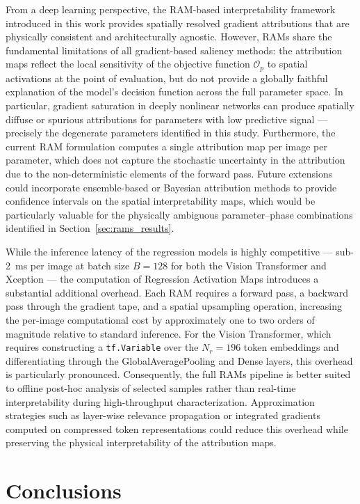\documentclass[final,5p,times,twocolumn]{elsarticle}
\begin{document}
From a deep learning perspective, the RAM-based 
interpretability framework introduced in this work 
provides spatially resolved gradient attributions 
that are physically consistent and architecturally 
agnostic. However, RAMs share the fundamental 
limitations of all gradient-based saliency methods: 
the attribution maps reflect the local sensitivity 
of the objective function $\mathcal{O}_p$ to spatial 
activations at the point of evaluation, but do not 
provide a globally faithful explanation of the 
model's decision function across the full parameter 
space. In particular, gradient saturation in deeply 
nonlinear networks can produce spatially diffuse 
or spurious attributions for parameters with low 
predictive signal --- precisely the degenerate 
parameters identified in this study. Furthermore, 
the current RAM formulation computes a single 
attribution map per image per parameter, which 
does not capture the stochastic uncertainty in 
the attribution due to the non-deterministic 
elements of the forward pass. Future extensions 
could incorporate ensemble-based or Bayesian 
attribution methods to provide confidence intervals 
on the spatial interpretability maps, which would 
be particularly valuable for the physically 
ambiguous parameter--phase combinations identified 
in Section~\ref{sec:rams_results}.

While the inference latency of the regression models 
is highly competitive --- sub-2~ms per image at 
batch size $B=128$ for both the Vision Transformer 
and Xception --- the computation of Regression 
Activation Maps introduces a substantial additional 
overhead. Each RAM requires a forward pass, a 
backward pass through the gradient tape, and a 
spatial upsampling operation, increasing the 
per-image computational cost by approximately one 
to two orders of magnitude relative to standard 
inference. For the Vision Transformer, which 
requires constructing a \texttt{tf.Variable} over 
the $N_r = 196$ token embeddings and differentiating 
through the GlobalAveragePooling and Dense layers, 
this overhead is particularly pronounced. 
Consequently, the full RAMs pipeline is better 
suited to offline post-hoc analysis of selected 
samples rather than real-time interpretability 
during high-throughput characterization. 
Approximation strategies such as layer-wise 
relevance propagation or integrated gradients 
computed on compressed token representations could 
reduce this overhead while preserving the physical 
interpretability of the attribution maps.

\section{Conclusions}
\label{sec:conclusions}
\end{document}
